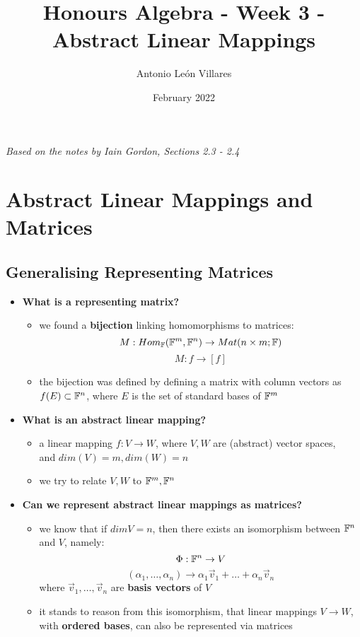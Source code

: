 \documentclass{exam}
\title{Honours Algebra - Week 3 - Abstract Linear Mappings}
\author{Antonio León Villares}
\date{February 2022}
\begin{document}
\maketitle

\tableofcontents

\pagebreak

\textit{Based on the notes by Iain Gordon, Sections 2.3 - 2.4}

\section{Abstract Linear Mappings and Matrices}

\subsection{Generalising Representing Matrices}

\begin{itemize}
    \item \textbf{What is a representing matrix?}
    \begin{itemize}
        \item we found a \textbf{bijection} linking homomorphisms to matrices:
        \[
        M: Hom_{\mathbb{F}}(\mathbb{F}^m, \mathbb{F}^n) \to Mat(n \times m; \mathbb{F})
        \]
        \[
        M : f \to [f]
        \]
        \item the bijection was defined by defining a matrix with column vectors as $f(E) \subset \mathbb{F}^n$, where $E$ is the set of standard bases of $\mathbb{F}^m$
    \end{itemize}
    \item \textbf{What is an abstract linear mapping?}
    \begin{itemize}
        \item a linear mapping $f : V \to W$, where $V,W$ are (abstract) vector spaces,\\and $dim(V) = m, dim(W) = n$
        \item we try to relate $V,W$ to $\mathbb{F}^m, \mathbb{F}^n$
    \end{itemize}
    \item \textbf{Can we represent abstract linear mappings as matrices?}
    \begin{itemize}
        \item we know that if $dim V = n$, then there exists an isomorphism between $\mathbb{F}^n$ and $V$, namely:
        \[
        \Phi : \mathbb{F}^n \to V
        \]
        \[
        (\alpha_1, \ldots, \alpha_n) \to \alpha_1\vec{v}_1 + \ldots + \alpha_n\vec{v}_n
        \]
        where $\vec{v}_1, \ldots, \vec{v}_n$ are \textbf{basis vectors} of $V$
        \item it stands to reason from this isomorphism, that linear mappings $V \to W$, with \textbf{ordered bases}, can also be represented via matrices
    \end{itemize}
\end{itemize}
\end{document}
